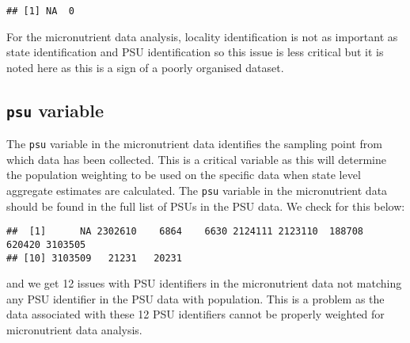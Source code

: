 \documentclass[12pt,a4paper]{article}
\newenvironment{Shaded}{\begin{snugshade}}{\end{snugshade}}
\newcommand{\KeywordTok}[1]{\textcolor[rgb]{0.13,0.29,0.53}{\textbf{#1}}}
\newcommand{\NormalTok}[1]{#1}
\newcommand{\OperatorTok}[1]{\textcolor[rgb]{0.81,0.36,0.00}{\textbf{#1}}}
\newcommand{\StringTok}[1]{\textcolor[rgb]{0.31,0.60,0.02}{#1}}
\begin{document}
\begin{Shaded}
\end{Shaded}

\begin{verbatim}
## [1] NA  0
\end{verbatim}

For the micronutrient data analysis, locality identification is not as important as state identification and PSU identification so this issue is less critical but it is noted here as this is a sign of a poorly organised dataset.

\hypertarget{psu-variable}{%
\subsection{\texorpdfstring{\texttt{psu} variable}{psu variable}}\label{psu-variable}}

The \texttt{psu} variable in the micronutrient data identifies the sampling point from which data has been collected. This is a critical variable as this will determine the population weighting to be used on the specific data when state level aggregate estimates are calculated. The \texttt{psu} variable in the micronutrient data should be found in the full list of PSUs in the PSU data. We check for this below:

\begin{Shaded}
\end{Shaded}

\begin{verbatim}
##  [1]      NA 2302610    6864    6630 2124111 2123110  188708  620420 3103505
## [10] 3103509   21231   20231
\end{verbatim}

and we get 12 issues with PSU identifiers in the micronutrient data not matching any PSU identifier in the PSU data with population. This is a problem as the data associated with these 12 PSU identifiers cannot be properly weighted for micronutrient data analysis.
\end{document}
